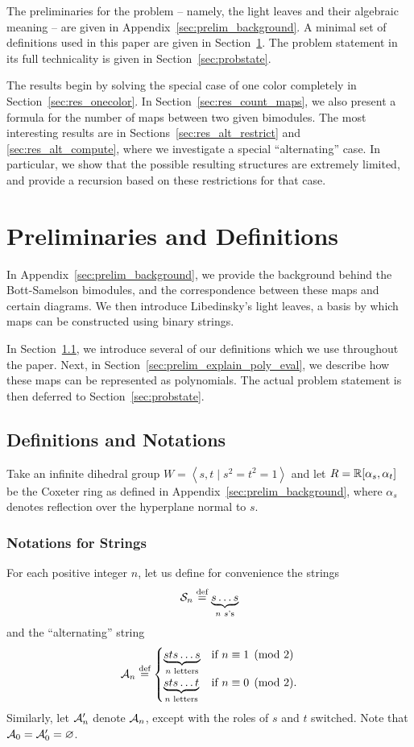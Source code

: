 The preliminaries for the problem -- namely, the light leaves and their algebraic meaning -- are given in Appendix~\ref{sec:prelim_background}.  A minimal set of definitions used in this paper are given in Section~\ref{sec:prelim}.  The problem statement in its full technicality is given in Section~\ref{sec:probstate}.

The results begin by solving the special case of one color completely in Section~\ref{sec:res_onecolor}.  In Section~\ref{sec:res_count_maps}, we also present a formula for the number of maps between two given bimodules.  The most interesting results are in Sections~\ref{sec:res_alt_restrict} and \ref{sec:res_alt_compute}, where we investigate a special ``alternating'' case.  In particular, we show that the possible resulting structures are extremely limited, and provide a recursion based on these restrictions for that case.

\section{Preliminaries and Definitions}
\label{sec:prelim}
In Appendix~\ref{sec:prelim_background}, we provide the background behind the Bott-Samelson bimodules, and the correspondence between these maps and certain diagrams.  We then introduce Libedinsky's light leaves, a basis by which maps can be constructed using binary strings.

In Section~\ref{sec:prelim_def_notation}, we introduce several of our definitions which we use throughout the paper.  Next, in Section~\ref{sec:prelim_explain_poly_eval}, we describe how these maps can be represented as polynomials.  The actual problem statement is then deferred to Section~\ref{sec:probstate}.
\subsection{Definitions and Notations}
\label{sec:prelim_def_notation}
Take an infinite dihedral group $W=\left<s,t\mid s^2=t^2=1\right>$ and let $R = \RR[\alpha_s, \alpha_t]$ be the Coxeter ring as defined in Appendix~\ref{sec:prelim_background}, where $\alpha_s$ denotes reflection over the hyperplane normal to $s$.  
\subsubsection{Notations for Strings}
For each positive integer $n$, let us define for convenience the strings
\[ \SS_n \defeq \underbrace{s \dots s}_{\text{$n$ $s$'s}} \] 
and the ``alternating'' string
\[
	\AA_n \defeq
	\begin{cases}
		\underbrace{sts\dots s}_{\text{$n$ letters}} & \text{if } n \equiv 1 \pmod{2} \\
		\underbrace{sts\dots t}_{\text{$n$ letters}} & \text{if } n \equiv 0 \pmod{2}. 
	\end{cases}
\]
Similarly, let $\AA_n'$ denote $\AA_n$, except with the roles of $s$ and $t$ switched.  Note that $\AA_0 = \AA_0' = \varnothing$.

